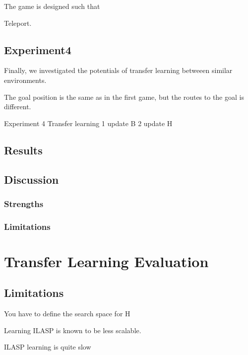 The game is designed such that 

Teleport. 

\subsection{Experiment4}
Finally, we investigated the potentials of transfer learning betweeen similar environments. 

The goal position is the same as in the first game, but the routes to the goal is different. 

Experiment 4 Transfer learning 
    1 update B
    2 update H

\subsection{Results}


\subsection{Discussion}
\subsubsection{Strengths}

\subsubsection{Limitations}

\section{Transfer Learning Evaluation}
\label{transfer_learning}

\subsection{Limitations}

You have to define the search space for H

Learning ILASP is known to be less scalable. 

ILASP learning is quite slow